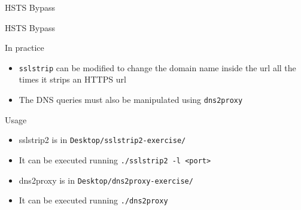 \documentclass{beamer}
\begin{document}
\begin{frame}{HSTS Bypass}
\end{frame}
\begin{frame}{HSTS Bypass}
  \begin{block}{In practice}
  \begin{itemize}
      \item \texttt{sslstrip} can be modified to change the domain name inside the url all the times it strips an HTTPS url 
      \item The DNS queries must also be manipulated using \texttt{dns2proxy}
    \end{itemize}
  \end{block}
  \begin{block}{Usage}
  \begin{itemize}
      \item sslstrip2 is in \texttt{Desktop/sslstrip2-exercise/}
      \item It can be executed running \texttt{./sslstrip2 -l <port>}
      \item dns2proxy is in \texttt{Desktop/dns2proxy-exercise/}
      \item It can be executed running \texttt{./dns2proxy}
  \end{itemize}
  \end{block}
\end{frame}
\end{document}
